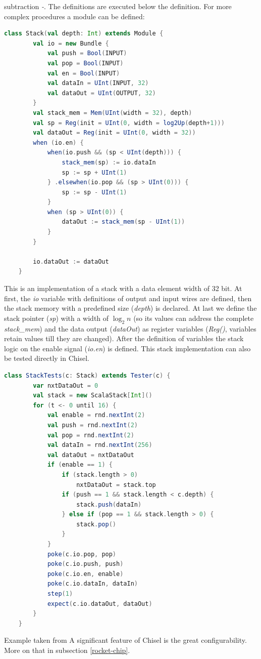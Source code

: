 subtraction \textit{-}. The definitions are executed below the definition.
For more complex procedures a module can be defined:
\begin{lstlisting}[language=scala, frame=single]
    class Stack(val depth: Int) extends Module {
        val io = new Bundle {
            val push = Bool(INPUT)
            val pop = Bool(INPUT)
            val en = Bool(INPUT)
            val dataIn = UInt(INPUT, 32)
            val dataOut = UInt(OUTPUT, 32)
        }
        val stack_mem = Mem(UInt(width = 32), depth)
        val sp = Reg(init = UInt(0, width = log2Up(depth+1)))
        val dataOut = Reg(init = UInt(0, width = 32))
        when (io.en) {
            when(io.push && (sp < UInt(depth))) {
                stack_mem(sp) := io.dataIn
                sp := sp + UInt(1)
            } .elsewhen(io.pop && (sp > UInt(0))) {
                sp := sp - UInt(1)
            }
            when (sp > UInt(0)) {
                dataOut := stack_mem(sp - UInt(1))
            }
        }
    
        io.dataOut := dataOut
    }
\end{lstlisting}
This is an implementation of a stack with a data element width
of 32 bit. At first, the \textit{io} variable with definitions of output
and input wires are defined, then the stack memory with a
predefined size (\textit{depth}) is declared.
At last we define the stack pointer (\textit{sp}) with a
width of $\log_{2} n$ (so its values can address 
the complete \textit{stack\_mem}) and the data output (\textit{dataOut})
as register variables (\textit{Reg()}, variables 
retain values till they are changed).
After the definition of variables the stack logic on
the enable signal (\textit{io.en}) is defined.
This stack implementation can also be tested directly in Chisel.
\begin{lstlisting}[language=scala, frame=single]
    class StackTests(c: Stack) extends Tester(c) {
        var nxtDataOut = 0
        val stack = new ScalaStack[Int]()
        for (t <- 0 until 16) {
            val enable = rnd.nextInt(2)
            val push = rnd.nextInt(2)
            val pop = rnd.nextInt(2)
            val dataIn = rnd.nextInt(256)
            val dataOut = nxtDataOut
            if (enable == 1) {
                if (stack.length > 0)
                    nxtDataOut = stack.top
                if (push == 1 && stack.length < c.depth) {
                    stack.push(dataIn)
                } else if (pop == 1 && stack.length > 0) {
                    stack.pop()
                }
            }
            poke(c.io.pop, pop)
            poke(c.io.push, push)
            poke(c.io.en, enable)
            poke(c.io.dataIn, dataIn)
            step(1)
            expect(c.io.dataOut, dataOut)
        }
    }
\end{lstlisting}
Example taken from \cite[p.~45]{risc-v_chisel}\newline
A significant feature of Chisel is the great configurability.
More on that in subsection \ref{rocket-chip}.
